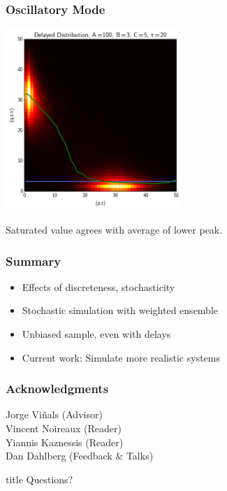 \documentclass[xcolor={usenames,dvipsnames,svgnames},url=hyphens]{beamer}
\begin{document}
\begin{frame}
    \frametitle{Oscillatory Mode}

    \begin{center}
        \includegraphics[width=0.5\textwidth]{../results/presentation/ddjd-ca-a100-c5-t20.png}
    \end{center}

    Saturated value agrees with average of lower peak.
\end{frame}

\begin{frame}
    \frametitle{Summary}
    \begin{itemize}
        \item Effects of discreteness, stochasticity
        \item Stochastic simulation with weighted ensemble
        \item Unbiased sample, even with delays
        \item Current work: Simulate more realistic systems
    \end{itemize}
\end{frame}

\begin{frame}
    \frametitle{Acknowledgments}
    Jorge Viñals (Advisor)\\[2ex]

    Vincent Noireaux (Reader)\\
    Yiannis Kaznessis (Reader)\\[2ex]

    Dan Dahlberg (Feedback \& Talks)
\end{frame}

\begin{frame}[plain]

\hfill
    \begin{beamercolorbox}[rounded=true, center, shadow=true,wd=6cm]{title}
        \huge Questions?
    \end{beamercolorbox}
\hfill\hfill

\end{frame}
\end{document}
